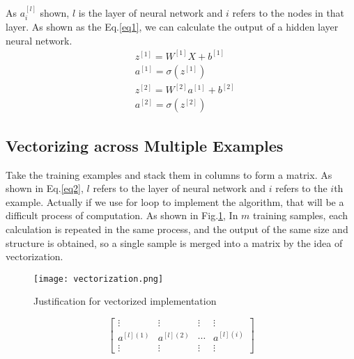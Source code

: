 \documentclass[a4paper]{article}
\begin{document}
%
As $a_i^{\left[l\right]}$ shown, $l$ is the layer of neural network and $i$ refers to the nodes in that layer. As shown as the Eq.\ref{eq1}, we can calculate the output of a hidden layer neural network.
\begin{equation}
	\begin{aligned}
   &z^{\left[1\right]} = W^{\left[1\right]}X+b^{\left[1\right]}\\
   &a^{\left[1\right]} = \sigma \left(z^{\left[1\right]}\right)\\
   &z^{\left[2\right]} = W^{\left[2\right]}a^{\left[1\right]}+b^{\left[2\right]}\\
   &a^{\left[2\right]} = \sigma \left(z^{\left[2\right]}\right)
   \end{aligned}
   \label{eq1}
\end{equation}
\subsection{Vectorizing across Multiple Examples}
Take the training examples and stack them in columns to form a matrix. As shown in Eq.\ref{eq2}, $l$ refers to the layer of neural network and $i$ refers to the $i$th example. Actually if we use for loop to implement the algorithm, that will be a difficult process of computation. As shown in Fig.\ref{vectorization}, In $m$ training samples, each calculation is repeated in the same process, and the output of the same size and structure is obtained, so a single sample is merged into a matrix by the idea of vectorization.
%
\begin{figure}[h]
	\centering
	\texttt{[image: vectorization.png]}
	\caption{Justification for vectorized implementation}
	\label{vectorization}
\end{figure}
%
\begin{equation}
 \begin{bmatrix}
 \vdots&  \vdots&  \vdots& \vdots\\ 
 a^{\left[l\right]\left(1\right)}& a^{\left[l\right]\left(2\right)}  &\cdots &a^{\left[l\right]\left(i\right)} \\ 
 \vdots&  \vdots&  \vdots& \vdots
 \end{bmatrix}
\label{eq2}
\end{equation}
%
\end{document}
